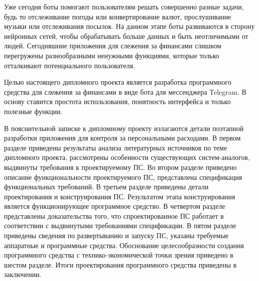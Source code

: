 Уже сегодня боты помогают пользователям решать совершенно разные задачи, будь то отслеживание погоды или конвертирование валют, прослушивание музыки или отслеживания посылок. На данном этапе боты развиваются в сторону нейронных сетей, чтобы обрабатывать больше данных и быть неотличимыми от людей. Сегодняшние приложения для слежения за финансами слишком перегружены разнообразными ненужными функциями, которые только отталкивают потенциального пользователя.

Целью настоящего дипломного проекта является разработка \linebreak программного средства для слежения за финансами в виде бота для мессенджера Telegram. В основу ставится простота использования, понятность интерфейса и только полезные функции.

В пояснительной записке к дипломному проекту излагаются детали поэтапной разработки приложения для контроля за персональными расходами. В первом разделе приведены результаты анализа литературных источников по теме дипломного проекта, рассмотрены особенности существующих систем-аналогов, выдвинуты требования к проектируемому ПС. Во втором разделе приведено описание функциональности проектируемого ПС, представлена спецификация функциональных требований. В третьем разделе приведены детали проектирования и конструирования ПС. Результатом этапа конструирования является функционирующее программное средство. В четвертом разделе представлены доказательства того, что спроектированное ПС работает в соответствии с выдвинутыми требованиями спецификации. В пятом разделе приведены сведения по развертыванию и запуску ПС, указаны требуемые аппаратные и программные средства. Обоснование целесообразности создания программного средства с технико-экономической точки зрения приведено в шестом разделе. Итоги проектирования программного средства приведены в заключении.
